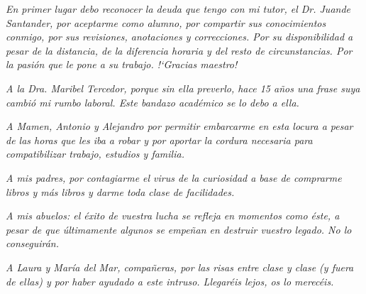 

\begin{flushright}

\textit{En primer lugar debo reconocer la deuda que tengo con mi tutor, el Dr. Juande Santander, por aceptarme como alumno, por compartir sus conocimientos conmigo, por sus revisiones, anotaciones y correcciones. Por su disponibilidad a pesar de la distancia, de la diferencia horaria y del resto de circunstancias. Por la pasi\'on que le pone a su trabajo. !`Gracias maestro!}


\textit{\newline A la Dra. Maribel Tercedor, porque sin ella preverlo, hace 15 a\~{n}os una frase suya cambi\'o mi rumbo laboral. Este bandazo acad\'emico se lo debo a ella.}


\textit{\newline A Mamen, Antonio y Alejandro por permitir embarcarme en esta locura a pesar de las horas que les iba a robar y por aportar la cordura necesaria para compatibilizar trabajo, estudios y familia.}


\textit{\newline A mis padres, por contagiarme el virus de la curiosidad a base de comprarme libros y m\'as libros y darme toda clase de facilidades.}


\textit{\newline A mis abuelos: el \'exito de vuestra lucha se refleja en momentos como \'este, a pesar de que últimamente algunos se empe\~{n}an en destruir vuestro legado. No lo conseguir\'an.}


\textit{\newline A Laura y Mar\'ia del Mar, compa\~{n}eras, por las risas entre clase y clase (y fuera de ellas) y por haber ayudado a este \emph{intruso}. Llegar\'eis lejos, os lo merec\'eis.} 

\end{flushright}
